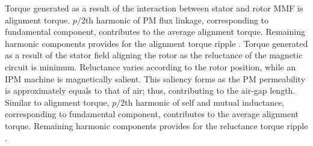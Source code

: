 \documentclass [a4 paper, 11pt, titlepage] {article}
\begin{document}
	Torque generated as a result of the interaction between stator and rotor MMF is alignment torque. $p/2$th harmonic of PM flux linkage, corresponding to fundamental component, contributes to the average alignment torque. Remaining harmonic components provides for the alignment torque ripple \cite{farshadnia_advanced_2018}.
	Torque generated as a result of the stator field aligning the rotor as the reluctance of the magnetic circuit is minimum. Reluctance varies according to the rotor position, while an IPM machine is magnetically salient. This saliency forms as the PM permeability is approximately equals to that of air; thus, contributing to the air-gap length. Similar to alignment torque, $p/2$th harmonic of self and mutual inductance, corresponding to fundamental component, contributes to the average alignment torque. Remaining harmonic components provides for the reluctance torque ripple \cite{farshadnia_advanced_2018}.
	
\end{document}
